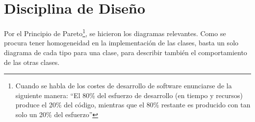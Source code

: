 
\chapter{Disciplina de Diseño}
	\label{chap:disenio}
	Por el Principio de Pareto\footnote{Cuando se habla de los costes de desarrollo de software enunciarse de la siguiente manera: ``El 80\% del esfuerzo de desarrollo (en tiempo y recursos) produce el 20\% del código, mientras que el 80\% restante es producido con tan solo un 20\% del esfuerzo''}, se hicieron los diagramas relevantes. Como se procura tener homogeneidad en la implementación de las clases, basta un solo diagrama de cada tipo para una clase, para describir también el comportamiento de las otras clases.

